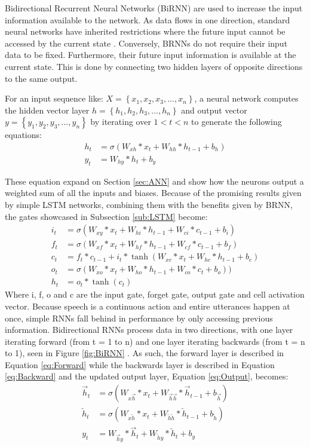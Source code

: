 Bidirectional Recurrent Neural Networks (BiRNN) are used to increase the 
input information available to the network. As data flows in one direction, standard neural networks have inherited restrictions where 
the future input cannot be accessed by the current state \cite{graves2005bidirectional}. Conversely,
BRNNs do not require their input data to be fixed. Furthermore, their 
future input information is available at the current state. This is done
by connecting two hidden layers of opposite directions to the same output.

For an input sequence like: $X=\left\{x_1,x_2,x_3,...,x_n \right\}$, a 
neural network computes the hidden vector layer 
$h=\left\{h_1,h_2,h_3,...,h_n \right\}$ and output vector 
$y=\left\{y_1,y_2,y_3,...,y_n \right\}$ by iterating over  $1<t<n$ to generate the following equations:
\begin{align}
h_t &= \sigma(W_{xh}*x_t + W_{hh}*h_{t-1} + b_h)\\
y_t &= W_{hy}*h_t + b_y
\end{align}

These equation expand on Section \ref{sec:ANN} and show how the neurons output a weighted sum of all the inputs and biases.
Because of the promising results given by simple LSTM networks, combining them with the benefits given by BRNN, the gates showcased in 
Subsection \ref{sub:LSTM} become:
\begin{align}
i_t &= \sigma(W_{xy} * x_t + W_{hi} * h_{t-1} + W_{ci} * c_{t-1} + b_i)
\\
f_t &= \sigma(W_{xf} * x_t + W_{hf} * h_{t-1} + W_{cf} * c_{t-1} + b_f) \\
c_t &= f_t * c_{t-1} + i_{t} * \tanh(W_{xc} * x_t + W_{hc} *  h_{t-1} + b_c)
\\
o_t &= \sigma(W_{xo} * x_t + W_{ho} * h_{t-1} + W_{co} * c_t +b_o))
\\
h_t &= o_t * \tanh(c_t)
\end{align}
Where i, f, o and c are the input gate, forget gate, output gate and cell activation vector. Because speech is a continuous action and entire utterances happen at once, simple RNNs fall behind in performance by only accessing previous information. Bidirectional RNNs process data in
two directions, with one layer iterating  forward (from t = 1 to n) and one layer iterating backwards (from t = n to 1), seen in Figure \ref{fig:BiRNN} \cite{graves2013hybrid}. As such, the forward layer is described in Equation \ref{eq:Forward} while the backwards layer is described in Equation \ref{eq:Backward} and the updated output layer, Equation \ref{eq:Output}, becomes:
\begin{align}
\overrightarrow{h}_t &= \sigma(W_{x\overrightarrow{h}} * x_t + W_{\overrightarrow{h}\overrightarrow{h}} * \overrightarrow{h}_{t-1}+ b_{\overrightarrow{h}}) \label{eq:Forward}
\\
\overleftarrow{h}_t &= \sigma(W_{x\overleftarrow{h}} * x_t + W_{\overleftarrow{h}\overleftarrow{h}} * \overleftarrow{h}_{t-1}+ b_{\overleftarrow{h}}) \label{eq:Backward}
\\
y_t &= W_{\overrightarrow{h}y} * \overrightarrow{h}_t + W_{\overleftarrow{h}y} * \overleftarrow{h}_t + b_y \label{eq:Output}
\end{align}


